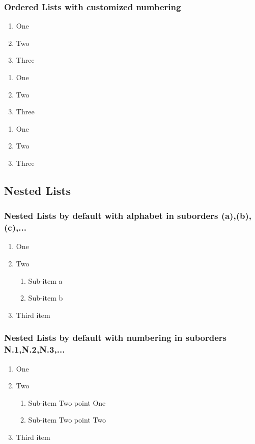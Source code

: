 \documentclass[11pt, a4paper]{article}
\begin{document}
	\subsubsection{Ordered Lists with customized numbering}
	\begin{enumerate}[label=(\roman*)]
		\item One
		\item Two
		\item Three
	\end{enumerate}
	\begin{enumerate}[label=\arabic*)]
		\item One
		\item Two
		\item Three
	\end{enumerate}
	\begin{enumerate}[label=(\alph*)]
		\item One
		\item Two
		\item Three
	\end{enumerate}

	\subsection{Nested Lists}
	\subsubsection{Nested Lists by default with alphabet in suborders 
		(a),(b),(c),...}
	\begin{enumerate}
		\item One
		\item Two
		\begin{enumerate}
			\item Sub-item a
			\item Sub-item b
		\end{enumerate}
		\item Third item
	\end{enumerate}

	\subsubsection{Nested Lists by default with numbering in suborders
		 N.1,N.2,N.3,...}
	\begin{enumerate}
		\item One
		\item Two
		\begin{enumerate}[label*=\arabic*.]%
			\item Sub-item Two point One
			\item Sub-item Two point Two
		\end{enumerate}
		\item Third item
	\end{enumerate}
\end{document}
